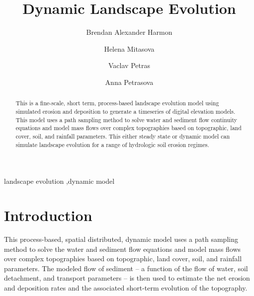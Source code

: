 \documentclass[final,3p,times,twocolumn]{elsarticle}
\begin{document}
\begin{frontmatter}

\title{Dynamic Landscape Evolution}

\author[cga,la]{Brendan Alexander Harmon}


\author[cga,meas]{Helena Mitasova}

\author[cga,meas]{Vaclav Petras}

\author[cga,meas]{Anna Petrasova}

\address[cga]{Center for Geospatial Analytics, North Carolina State University, Raleigh, North Carolina, United States of America}
\address[la]{Department of Landscape Architecture, North Carolina State University, Raleigh, North Carolina, United States of America}
\address[meas]{Department of Marine, Earth, and Atmospheric Sciences, North Carolina State University, Raleigh, North Carolina, United States of America}


\begin{abstract}
This is a fine-scale, short term, process-based landscape evolution model using simulated erosion and deposition to generate a timeseries of digital elevation models. This model uses a path sampling method to solve water and sediment flow continuity equations and model mass flows over complex topographies based on topographic, land cover, soil, and rainfall parameters. This either steady state or dynamic model can simulate landscape evolution for a range of hydrologic soil erosion regimes. 
\end{abstract}

\begin{keyword}
landscape evolution \sep dynamic model
\end{keyword}

\end{frontmatter}

\section{Introduction}

This process-based, spatial distributed, dynamic model uses a path sampling method to solve the water and sediment flow equations
\cite{mitasova2004}
and model mass flows over complex topographies based on topographic, land cover, soil, and rainfall parameters.
The modeled flow of sediment -- a function of the flow of water, soil detachment, and transport parameters -- is then used to estimate the net erosion and deposition rates and the associated short-term evolution of the topography.
\end{document}
